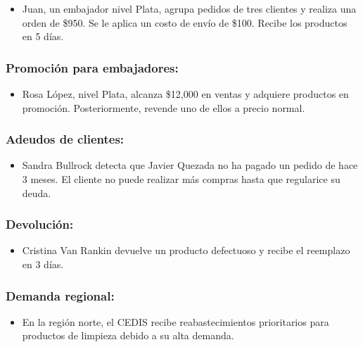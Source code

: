 \documentclass[
  letterpaper,
  DIV=11,
  numbers=noendperiod]{scrreprt}
\providecommand{\tightlist}{%
  \setlength{\itemsep}{0pt}\setlength{\parskip}{0pt}}\usepackage{longtable,booktabs,array}
\begin{document}
\begin{itemize}
\tightlist
\item
  Juan, un embajador nivel Plata, agrupa pedidos de tres clientes y
  realiza una orden de \$950. Se le aplica un costo de envío de \$100.
  Recibe los productos en 5 días.
\end{itemize}

\subsubsection{Promoción para
embajadores:}\label{promociuxf3n-para-embajadores}

\begin{itemize}
\tightlist
\item
  Rosa López, nivel Plata, alcanza \$12,000 en ventas y adquiere
  productos en promoción. Posteriormente, revende uno de ellos a precio
  normal.
\end{itemize}

\subsubsection{Adeudos de clientes:}\label{adeudos-de-clientes}

\begin{itemize}
\tightlist
\item
  Sandra Bullrock detecta que Javier Quezada no ha pagado un pedido de
  hace 3 meses. El cliente no puede realizar más compras hasta que
  regularice su deuda.
\end{itemize}

\subsubsection{Devolución:}\label{devoluciuxf3n}

\begin{itemize}
\tightlist
\item
  Cristina Van Rankin devuelve un producto defectuoso y recibe el
  reemplazo en 3 días.
\end{itemize}

\subsubsection{Demanda regional:}\label{demanda-regional}

\begin{itemize}
\tightlist
\item
  En la región norte, el CEDIS recibe reabastecimientos prioritarios
  para productos de limpieza debido a su alta demanda.
\end{itemize}
\end{document}
